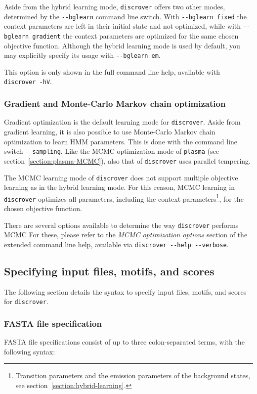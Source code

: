 \documentclass[a4paper]{article}
\newcommand{\plasma}[0]{\texttt{plasma}}
\newcommand{\discrover}[0]{\texttt{discrover}}
\begin{document}
Aside from the hybrid learning mode, \discrover{} offers two other modes, determined by the \verb|--bglearn| command line switch.
With \verb|--bglearn fixed| the context parameters are left in their initial state and not optimized, while with \verb|--bglearn gradient| the context parameters are optimized for the same chosen objective function.
Although the hybrid learning mode is used by default, you may explicitly specify its usage with \verb|--bglearn em|.

This option is only shown in the full command line help, available with \verb|discrover -hV|.

\subsubsection{Gradient and Monte-Carlo Markov chain optimization}
Gradient optimization is the default learning mode for \discrover{}.
Aside from gradient learning, it is also possible to use Monte-Carlo Markov chain optimization to learn HMM parameters.
This is done with the command line switch \verb|--sampling|.
Like the MCMC optimization mode of \plasma{} (see section~\ref{section:plasma-MCMC}), also that of \discrover{} uses parallel tempering.

The MCMC learning mode of \discrover{} does not support multiple objective learning as in the hybrid learning mode.
For this reason, MCMC learning in \discrover{} optimizes all parameters, including the context parameters\footnote{Transition parameters and the emission parameters of the background states, see section~\ref{section:hybrid-learning}.}, for the chosen objective function.

There are several options available to determine the way \discrover{} performs MCMC
For these, please refer to the \emph{MCMC optimization options} section of the extended command line help, available via \verb|discrover --help --verbose|.

\subsection{Specifying input files, motifs, and scores}
\label{section:specification}
The following section details the syntax to specify input files, motifs, and scores for \discrover{}.

\newcommand{\Item}[1]{\item[#1] \hfill \\}

\subsubsection{FASTA file specification}
FASTA file specifications consist of up to three colon-separated terms, with the following syntax:
\end{document}
